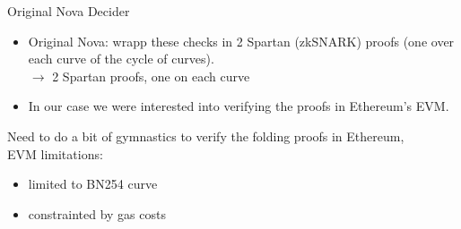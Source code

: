 \documentclass[t]{beamer} \usefonttheme[onlymath]{serif}
\begin{document}
\begin{frame}{Original Nova Decider}
  \begin{itemize}
    \item Original Nova: wrapp these checks in 2 Spartan (zkSNARK) proofs (one over each curve of the cycle of curves).\\
      $\longrightarrow$ 2 Spartan proofs, one on each curve\\
    \item In our case we were interested into verifying the proofs in Ethereum's EVM.
  \end{itemize}

  Need to do a bit of gymnastics to verify the folding proofs in Ethereum,\\
  EVM limitations:
  \begin{itemize}
    \item limited to BN254 curve
    \item constrainted by gas costs
  \end{itemize}
\end{frame}
\end{document}
